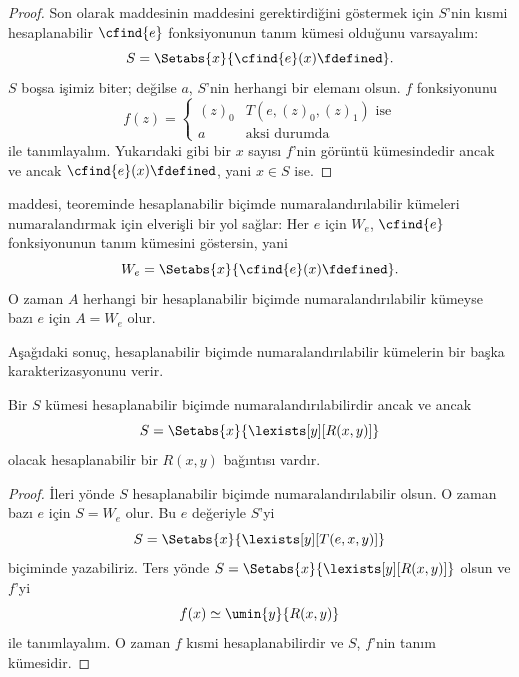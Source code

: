 \documentclass[../../../include/open-logic-section]{subfiles}
\begin{document}
\begin{proof}
Son olarak  maddesinin  maddesini
gerektirdiğini göstermek için $S$'nin kısmi hesaplanabilir
$\cfind{e}$ fonksiyonunun tanım kümesi olduğunu varsayalım:
\[
  S=\Setabs{x}{\cfind{e}(x)\fdefined}.
\]
$S$ boşsa işimiz biter; değilse $a$, $S$'nin herhangi bir elemanı olsun.
$f$ fonksiyonunu
\[
  f(z)=\begin{cases}
    (z)_0 & \text{$T(e,(z)_0,(z)_1)$ ise}\\
    a & \text{aksi durumda}
  \end{cases}
\]
ile tanımlayalım. Yukarıdaki gibi bir $x$ sayısı $f$'nin görüntü kümesindedir
ancak ve ancak $\cfind{e}(x)\fdefined$, yani $x\in S$ ise.
\end{proof}

 maddesi,  teoreminde
hesaplanabilir biçimde numaralandırılabilir kümeleri numaralandırmak için
elverişli bir yol sağlar: Her $e$ için $W_e$, $\cfind{e}$ fonksiyonunun tanım
kümesini göstersin, yani
\[
  W_e=\Setabs{x}{\cfind{e}(x)\fdefined}.
\]
O zaman $A$ herhangi bir hesaplanabilir biçimde numaralandırılabilir kümeyse
bazı $e$ için $A=W_e$ olur.

Aşağıdaki sonuç, hesaplanabilir biçimde numaralandırılabilir kümelerin bir
başka karakterizasyonunu verir.

\begin{thm}
Bir $S$ kümesi hesaplanabilir biçimde numaralandırılabilirdir ancak ve ancak
\[
  S=\Setabs{x}{\lexists[y][R(x,y)]}
\]
olacak hesaplanabilir bir $R(x,y)$ bağıntısı vardır.
\end{thm}

\begin{proof}
İleri yönde $S$ hesaplanabilir biçimde numaralandırılabilir olsun. O zaman
bazı $e$ için $S=W_e$ olur. Bu $e$ değeriyle $S$'yi
\[
  S=\Setabs{x}{\lexists[y][T(e,x,y)]}
\]
biçiminde yazabiliriz. Ters yönde
$S=\Setabs{x}{\lexists[y][R(x,y)]}$ olsun ve $f$'yi
\[
  f(x)\simeq\umin{y}{R(x,y)}
\]
ile tanımlayalım. O zaman $f$ kısmi hesaplanabilirdir ve $S$, $f$'nin tanım
kümesidir.
\end{proof}
\end{document}
